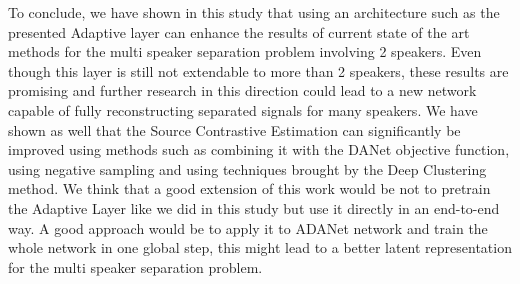 \documentclass[master, tikz, final,11pt, dvipdfmx]{iscs-thesis}
\begin{document}
To conclude, we have shown in this study that using an architecture such as the presented Adaptive layer can enhance the results of current state of the art methods for the multi speaker separation problem involving 2 speakers. Even though this layer is still not extendable to more than 2 speakers, these results are promising and further research in this direction could lead to a new network capable of fully reconstructing separated signals for many speakers.
We have shown as well that the Source Contrastive Estimation can significantly be improved using methods such as combining it with the DANet objective function, using negative sampling and using techniques brought by the Deep Clustering method.
We think that a good extension of this work would be not to pretrain the Adaptive Layer like we did in this study but use it directly in an end-to-end way. A good approach would be to apply it to ADANet \cite{DANet2} network and train the whole network in one global step, this might lead to a better latent representation for the multi speaker separation problem.





\end{document}
